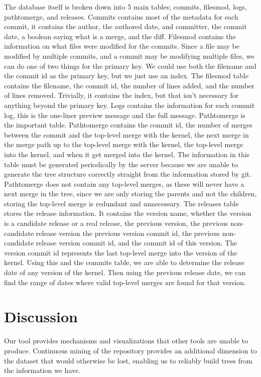 \documentclass[conference, draftclsnofoot]{IEEEtran}
\begin{document}
The database itself is broken down into 5 main tables; commits, filesmod, logs,
pathtomerge, and releases. Commits contains most of the metadata for each
commit, it contains the author, the authored date, and committer, the commit
date, a boolean saying what is a merge, and the diff. Filesmod contains the
information on what files were modified for the commits. Since a file may be
modified by multiple commits, and a commit may be modifying multiple files, we
can do one of two things for the primary key. We could use both the filename
and the commit id as the primary key, but we just use an index. The filesmod
table contains the filename, the commit id, the number of lines added, and the
number of lines removed. Trivially, it contains the index, but that isn't
necessary for anything beyond the primary key. Logs contains the information
for each commit log, this is the one-liner preview message and the full
message. Pathtomerge is the important table. Pathtomerge contains the commit
id, the number of merges between the commit and the top-level merge with the
kernel, the next merge in the merge path up to the top-level merge with the
kernel, the top-level merge into the kernel, and when it get merged into the
kernel. The information in this table must be generated periodically by the
server because we are unable to generate the tree structure correctly straight
from the information stored by git. Pathtomerge does not contain any top-level
merges, as these will never have a next merge in the tree, since we are only
storing the parents and not the children, storing the top-level merge is
redundant and unnecessary. The releases table stores the release information.
It contains the version name, whether the version is a candidate release or a
real release, the previous version, the previous non-candidate release version
the previous version commit id, the previous non-candidate release version
commit id, and the commit id of this version. The version commit id represents
the last top-level merge into the version of the kernel. Using this and the
commits table, we are able to determine the release date of any version of the
kernel. Then using the previous release date, we can find the range of dates
where valid top-level merges are found for that version.

\section{Discussion}

Our tool provides mechanisms and visualizations that other tools are unable to
produce. Continuous mining of the repository\cite{German} provides an
additional dimension to the dataset that would otherwise be lost, enabling us
to reliably build trees from the information we have.
\end{document}
